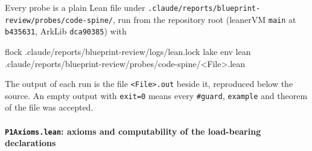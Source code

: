 Every probe is a plain Lean file under \texttt{.\allowbreak{}c\allowbreak{}l\allowbreak{}a\allowbreak{}u\allowbreak{}d\allowbreak{}e\allowbreak{}/\allowbreak{}r\allowbreak{}e\allowbreak{}p\allowbreak{}o\allowbreak{}r\allowbreak{}t\allowbreak{}s\allowbreak{}/\allowbreak{}b\allowbreak{}l\allowbreak{}u\allowbreak{}e\allowbreak{}p\allowbreak{}r\allowbreak{}i\allowbreak{}n\allowbreak{}t\allowbreak{}-{}\allowbreak{}r\allowbreak{}e\allowbreak{}v\allowbreak{}i\allowbreak{}e\allowbreak{}w\allowbreak{}/\allowbreak{}p\allowbreak{}r\allowbreak{}o\allowbreak{}b\allowbreak{}e\allowbreak{}s\allowbreak{}/\allowbreak{}c\allowbreak{}o\allowbreak{}d\allowbreak{}e\allowbreak{}-{}\allowbreak{}s\allowbreak{}p\allowbreak{}i\allowbreak{}n\allowbreak{}e\allowbreak{}/}, run from the repository root (leanerVM \texttt{main} at \texttt{b435631}, ArkLib \texttt{dca90385}) with

\begin{shellcode}
flock .claude/reports/blueprint-review/logs/lean.lock lake env lean .claude/reports/blueprint-review/probes/code-spine/<File>.lean
\end{shellcode}

The output of each run is the file \texttt{<File>.\allowbreak{}out} beside it, reproduced below the source. An empty output with \texttt{exit=0} means every \texttt{\#guard}, \texttt{example} and theorem of the file was accepted.

\paragraph{\texttt{P1Axioms.lean}: axioms and computability of the load-bearing declarations}\label{sec:gen-probe-spine-P1Axioms}

